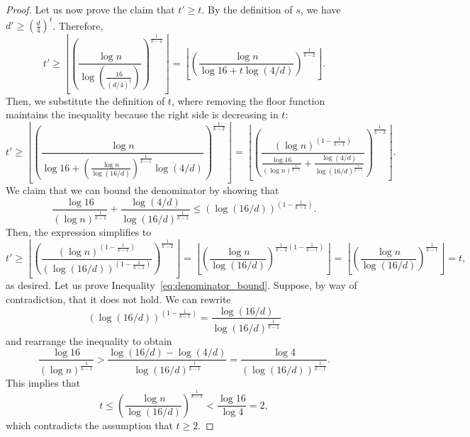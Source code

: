 \begin{theorem}
\begin{proof}
        Let us now prove the claim that $t' \geq t$.
        By the definition of $s$, we have $d' \geq \left( \frac{d}{4}\right)^t$.
        Therefore,
        \[
            t' \geq
            \left\lfloor \left(  \frac{\log n}{\log \left(\frac{16}{(d/4)^t}\right)}\right)^
            {\frac{1}{k-2}}\right\rfloor =
            \left\lfloor \left(  \frac{\log n}{\log 16 + t \log (4/d)}\right)^
            {\frac{1}{k-2}}\right\rfloor.
        \]
        Then, we substitute the definition of $t$, where removing the floor function
        maintains the inequality because the right side is decreasing in $t$:
        \begin{equation*}
            t' \geq
            \left\lfloor \left(  \frac{\log n}
            {\log 16 + \left(  \frac{\log n}{\log (16/d)}\right)^{\frac{1}{k-1}}  \log (4/d)}\right)^
            {\frac{1}{k-2}}\right\rfloor
            =
            \left\lfloor \left(  \frac{(\log n)^{\left(1-\frac{1}{k-1}\right)}}
            {\frac{\log 16}{(\log n)^{\frac{1}{k-1}}} + \frac{\log (4/d)}{\log (16/d)^{\frac{1}{k-1}}} }
           \right)^{\frac{1}{k-2}}\right\rfloor.
        \end{equation*}
        We claim that we can bound the denominator by showing that
        \begin{equation} \label{eq:denominator_bound}
            \frac{\log 16}{(\log n)^{\frac{1}{k-1}}} + \frac{\log (4/d)}{\log (16/d)^{\frac{1}{k-1}}}
            \leq \left( \log (16/d)\right)^{\left( 1 - \frac{1}{k-1}\right)}.
        \end{equation}
        Then, the expression simplifies to
        \[
            t'
            \geq \left\lfloor \left(  \frac{(\log n)^{\left(1-\frac{1}{k-1}\right)}}
            {\left( \log (16/d)\right)^{\left( 1 - \frac{1}{k-1}\right)}}
            \right)^{\frac{1}{k-2}}\right\rfloor
            = \left\lfloor \left(  \frac{\log n}
            {\log (16/d)}
            \right)^{\frac{1}{k-2}\left( 1 - \frac{1}{k-1}\right)}\right\rfloor
            = \left\lfloor \left(  \frac{\log n}{\log (16/d)}\right)^{\frac{1}{k-1}}\right\rfloor
            = t,
        \]
        as desired.
        Let us prove Inequality~\eqref{eq:denominator_bound}.
        Suppose, by way of contradiction, that it does not hold.
        We can rewrite
        \[
            (\log (16/d))^{\left( 1 - \frac{1}{k-1}\right)}
            = \frac{\log (16/d)}{\log (16/d)^{\frac{1}{k-1}}}
        \]
        and rearrange the inequality to obtain
        \[
            \frac{\log 16}{(\log n)^{\frac{1}{k-1}}}
            > \frac{\log (16/d) - \log (4/d)}{\log (16/d)^{\frac{1}{k-1}}}
            = \frac{\log 4}{(\log (16/d))^{\frac{1}{k-1}}}.
        \]
        This implies that
        \[
            t
            \leq \left( \frac{\log n}{\log (16/d)}\right)^{\frac{1}{k-1}}
            < \frac{\log 16}{\log 4} = 2,
        \]
        which contradicts the assumption that $t \geq 2$.
    \end{proof}
\end{theorem}

